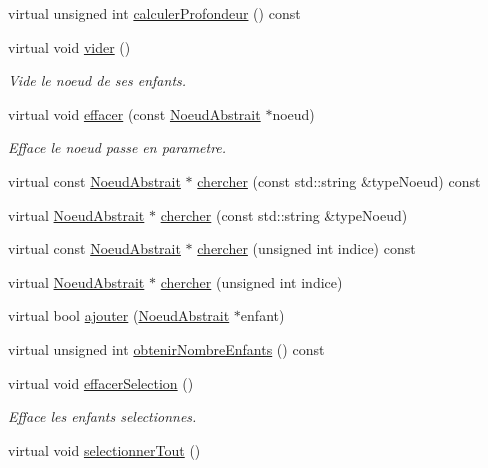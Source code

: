 \begin{DoxyCompactItemize}
\item 
virtual unsigned int \hyperlink{group__inf2990_gac2725a10b80438f67bb51076f13a78e1}{calculer\-Profondeur} () const 
\item 
virtual void \hyperlink{group__inf2990_ga5e1564f2f07f5cd84cef7078ae88e3c6}{vider} ()
\begin{DoxyCompactList}\small\item\em Vide le noeud de ses enfants. \end{DoxyCompactList}\item 
virtual void \hyperlink{group__inf2990_gabdc10574cb2b5c4825bc10b610fa9b5d}{effacer} (const \hyperlink{class_noeud_abstrait}{Noeud\-Abstrait} $\ast$noeud)
\begin{DoxyCompactList}\small\item\em Efface le noeud passe en parametre. \end{DoxyCompactList}\item 
virtual const \hyperlink{class_noeud_abstrait}{Noeud\-Abstrait} $\ast$ \hyperlink{group__inf2990_ga3bc273d5a3b1aed9e697bd2fa540403d}{chercher} (const std\-::string \&type\-Noeud) const 
\item 
virtual \hyperlink{class_noeud_abstrait}{Noeud\-Abstrait} $\ast$ \hyperlink{group__inf2990_ga622dcce31cdfb05afeedb7602e007f25}{chercher} (const std\-::string \&type\-Noeud)
\item 
virtual const \hyperlink{class_noeud_abstrait}{Noeud\-Abstrait} $\ast$ \hyperlink{group__inf2990_gacf157b0fc2a929cc8e711dba2e201660}{chercher} (unsigned int indice) const 
\item 
virtual \hyperlink{class_noeud_abstrait}{Noeud\-Abstrait} $\ast$ \hyperlink{group__inf2990_ga67f24432c3a667154adf005f2c6c4396}{chercher} (unsigned int indice)
\item 
virtual bool \hyperlink{group__inf2990_gac2ce823d2c52140d4e1a924163ebbb58}{ajouter} (\hyperlink{class_noeud_abstrait}{Noeud\-Abstrait} $\ast$enfant)
\item 
virtual unsigned int \hyperlink{group__inf2990_ga87b0010b4dc77c69c6114a70f3de73bd}{obtenir\-Nombre\-Enfants} () const 
\item 
virtual void \hyperlink{group__inf2990_ga64bcef79a467ea669275d885dbe31c8d}{effacer\-Selection} ()
\begin{DoxyCompactList}\small\item\em Efface les enfants selectionnes. \end{DoxyCompactList}\item 
virtual void \hyperlink{group__inf2990_ga6c0620784aa50cb5c19664124e884cdd}{selectionner\-Tout} ()

\end{DoxyCompactItemize}
